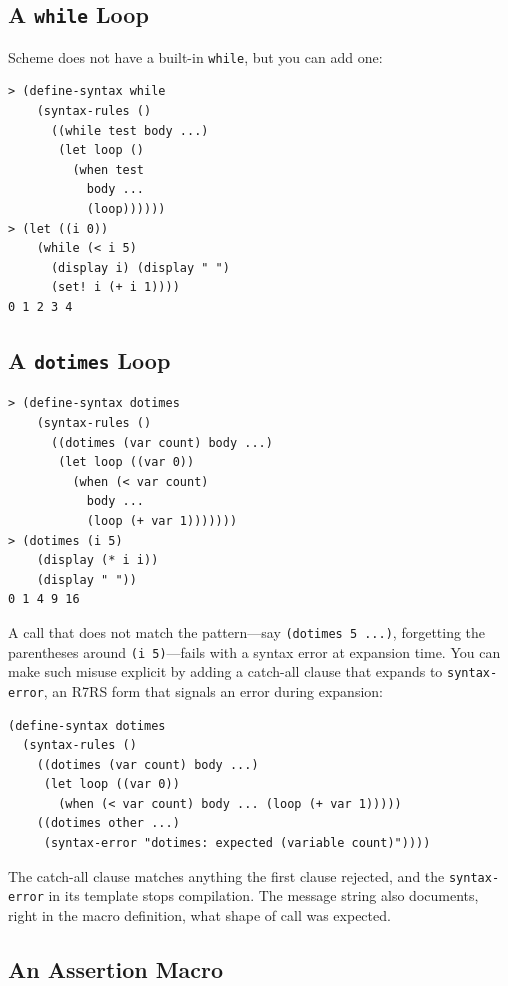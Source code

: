 \subsection{A \texttt{while} Loop}

Scheme does not have a built-in \texttt{while}, but you can add one:

\begin{lstlisting}[style=repl]
> (define-syntax while
    (syntax-rules ()
      ((while test body ...)
       (let loop ()
         (when test
           body ...
           (loop))))))
> (let ((i 0))
    (while (< i 5)
      (display i) (display " ")
      (set! i (+ i 1))))
0 1 2 3 4
\end{lstlisting}

\subsection{A \texttt{dotimes} Loop}

\begin{lstlisting}[style=repl]
> (define-syntax dotimes
    (syntax-rules ()
      ((dotimes (var count) body ...)
       (let loop ((var 0))
         (when (< var count)
           body ...
           (loop (+ var 1)))))))
> (dotimes (i 5)
    (display (* i i))
    (display " "))
0 1 4 9 16
\end{lstlisting}

A call that does not match the pattern---say \texttt{(dotimes 5 ...)}, forgetting the parentheses around \texttt{(i 5)}---fails with a syntax error at expansion time. You can make such misuse explicit by adding a catch-all clause that expands to \texttt{syntax-error}, an R7RS form that signals an error during expansion:

\begin{lstlisting}
(define-syntax dotimes
  (syntax-rules ()
    ((dotimes (var count) body ...)
     (let loop ((var 0))
       (when (< var count) body ... (loop (+ var 1)))))
    ((dotimes other ...)
     (syntax-error "dotimes: expected (variable count)"))))
\end{lstlisting}

The catch-all clause matches anything the first clause rejected, and the \texttt{syntax-error} in its template stops compilation. The message string also documents, right in the macro definition, what shape of call was expected.

\subsection{An Assertion Macro}

